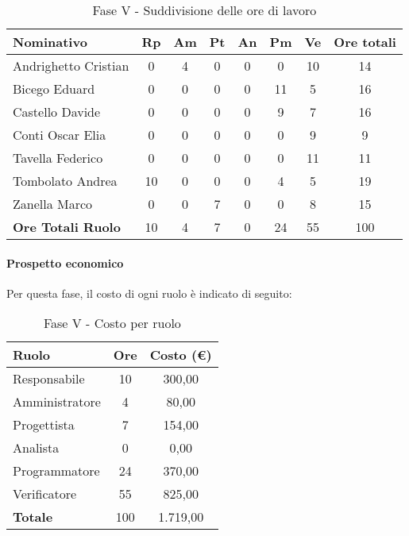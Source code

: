 \documentclass[../PianoProgetto.tex]{subfiles}
\begin{document}
	\begin{table}[h]
		\begin{tabularx}{\textwidth}{l  * {6}{C}  c}
			\toprule
			\textbf{Nominativo} & \textbf{Rp} & \textbf{Am} & \textbf{Pt} 
						& \textbf{An} & \textbf{Pm} & \textbf{Ve} & \textbf{Ore totali} \\
			\midrule
			Andrighetto Cristian & 0 & 4 & 0 & 0 & 0 & 10 & 14 \\
			Bicego Eduard & 0 & 0 &	0 &	0 &	11 & 5 & 16 \\
			Castello Davide & 0 & 0 & 0 & 0 & 9 & 7 & 16 \\
			Conti Oscar Elia &0 & 0 & 0 & 0 & 0 & 9 & 9 \\
			Tavella Federico &	0 & 0 & 0 & 0 & 0 & 11 & 11 \\
			Tombolato Andrea & 10 & 0 & 0 & 0 & 4 & 5 & 19 \\
			Zanella Marco & 0 & 0 & 7 & 0 & 0 & 8 & 15 \\
			\midrule			
			\textbf{Ore Totali Ruolo} & 10 & 4 &	7 &	0 &	24 & 55 & 100 \\
			\bottomrule
		\end{tabularx}
		
		\caption{Fase V - Suddivisione delle ore di lavoro}
		\label{tab:faseV_ore}
		
	\end{table}
	
	\paragraph{Prospetto economico}
					Per questa fase, il costo di ogni ruolo è indicato di seguito:
	\begin{table}[h]
		\centering
	
		\begin{tabular}{l * {2}{c}}
			\toprule
			\textbf{Ruolo} & \textbf{Ore} & \textbf{Costo (\euro{})} \\
			\midrule
			Responsabile &	10 &  300,00 \\
			Amministratore & 4 &  80,00 \\
			Progettista & 7 & 154,00 \\
			Analista & 0 & 0,00 \\
			Programmatore & 24 & 370,00 \\
			Verificatore & 55 & 825,00 \\
			\midrule		
			\textbf{Totale} & 100 & 1.719,00 \\
			\bottomrule
			
		\end{tabular}
		
		\caption{Fase V - Costo per ruolo}
		\label{tab:faseV_costo}
		
	\end{table}
	
\end{document}

